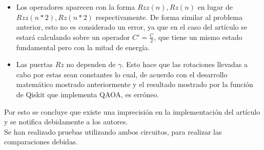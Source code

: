 \begin{itemize}
\item Los operadores aparecen con la forma $Rzz(n), Rz(n)$ en lugar de $Rzz(n*2), Rz(n*2)$ respectivamente.
  De forma similar al problema anterior, esto no es considerado un error, ya que en el caso del artículo\cite{multi-objective_routing_optimization} se estará calculando sobre un operador $C' = \frac{C}{2}$, que tiene un mismo estado fundamental pero con la mitad de energía.

\item Las puertas $Rz$ no dependen de $\gamma$.
  Esto hace que las rotaciones llevadas a cabo por estas sean constantes lo cual, de acuerdo con el desarrollo matemático mostrado anteriormente y el resultado mostrado por la función de Qiskit que implementa QAOA, es erróneo.
  
\end{itemize}

Por esto se concluye que existe una imprecisión en la implementación del artículo y se notifica debidamente a los autores.
\\
Se han realizado pruebas utilizando ambos circuitos, para realizar las comparaciones debidas.


